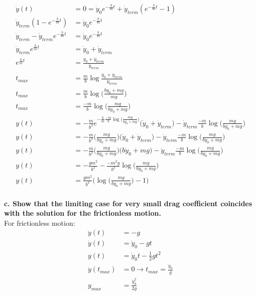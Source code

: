 \documentclass[10pt]{article} %
\begin{document}
\begin{align*}
  \dot{y}(t) &= 0 = \dot{y}_0e^{-\frac{b}{m}t} + \dot{y}_{term}(e^{-\frac{b}{m}t} - 1)\\
  \dot{y}_{term}(1 - e^{-\frac{b}{m}t}) &= \dot{y}_0e^{-\frac{b}{m}t}\\
  \dot{y}_{term} - \dot{y}_{term}e^{-\frac{b}{m}t} &= \dot{y}_0e^{-\frac{b}{m}t}\\
  \dot{y}_{term}e^{\frac{b}{m}t} &= \dot{y}_0 + \dot{y}_{term}\\
  e^{\frac{b}{m}t} &= \frac{\dot{y}_0 + \dot{y}_{term}}{\dot{y}_{term}}\\
  t_{max} &= \frac{m}{b}\log{\frac{\dot{y}_0 + \dot{y}_{term}}{\dot{y}_{term}}}\\
  t_{max} &= \frac{m}{b}\log\Big(\frac{b\dot{y}_0 + mg}{mg}\Big)\\
  t_{max} &= \frac{-m}{b}\log\Big(\frac{mg}{b\dot{y}_0 + mg}\Big)\\
  y(t) &= -\frac{m}{b^2}e^{-\frac{b}{m}\frac{-m}{b}\log\Big(\frac{mg}{b\dot{y}_0 + mg}\Big)}\Big(\dot{y}_0 + \dot{y}_{term} \Big) - \dot{y}_{term}\frac{-m}{b}\log\Big(\frac{mg}{b\dot{y}_0 + mg}\Big)\\
  y(t) &= -\frac{m}{b^2}\Big(\frac{mg}{b\dot{y}_0 + mg}\Big)\Big(\dot{y}_0 + \dot{y}_{term} \Big) - \dot{y}_{term}\frac{-m}{b}\log\Big(\frac{mg}{b\dot{y}_0 + mg}\Big)\\
  y(t) &= -\frac{m}{b^2}\Big(\frac{mg}{b\dot{y}_0 + mg}\Big)\Big(b\dot{y}_0 + mg\Big) - \dot{y}_{term}\frac{-m}{b}\log\Big(\frac{mg}{b\dot{y}_0 + mg}\Big)\\
  y(t) &= -\frac{gm^2}{b^2} - \frac{-m^2g}{b^2}\log\Big(\frac{mg}{b\dot{y}_0 + mg}\Big)\\
  y(t) &= \frac{gm^2}{b^2}\Bigg(\log\Big(\frac{mg}{b\dot{y}_0 + mg}\Big) - 1\Bigg)\\
\end{align*}

\textbf{c. Show that the limiting case for very small drag coefficient coincides with the solution for the frictionless motion.}\\
For frictionless motion:
\begin{align*}
  \ddot{y}(t) &= -g\\
  \dot{y}(t) &= \dot{y}_0 - gt\\
  y(t) &= \dot{y}_0t - \frac{1}{2}gt^2\\
  \dot{y}(t_{max}) &= 0 \rightarrow t_{max} = \frac{\dot{y}_0}{g}\\
  y_{max} &= \frac{\dot{y}_0^2}{2g}\\
\end{align*}
\end{document}
